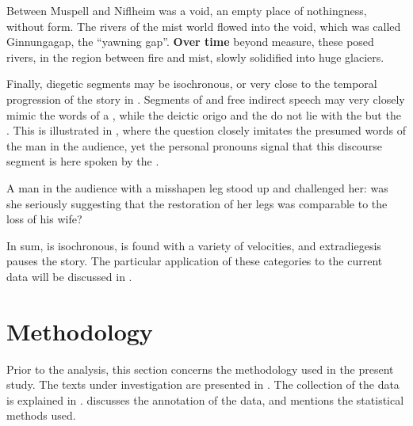 \documentclass[output=paper,colorlinks,citecolor=brown]{langscibook}
\begin{document}
\ea \label{ex:dieg} 
Between Muspell and Niflheim was a void, an empty place of nothingness, without form. The rivers of the mist world flowed into the void, which was called Ginnungagap, the ``yawning gap''. \textbf{Over time} beyond measure, these posed rivers, in the region between fire and mist, slowly solidified into huge glaciers. \hfill \citep[10]{Gaiman2017}
\z

Finally, diegetic segments may be isochronous, or very close to the temporal progression of the story in . Segments of  and free indirect speech may very closely mimic the words of a , while the deictic origo and the  do not lie with the  but the . This is illustrated in , where the question closely imitates the presumed words of the man in the audience, yet the personal pronouns signal that this discourse segment is here spoken by the .

\ea \label{ex:isoNA}
A man in the audience with a misshapen leg stood up and challenged her: was she seriously suggesting that the restoration of her legs was comparable to the loss of his wife? \hfill \citep[130]{Chiang2002}
\z

In sum,  is isochronous,  is found with a variety of velocities, and extradiegesis pauses the story. The particular application of these categories to the current data will be discussed in .


\section{Methodology}\label{sec:3}

Prior to the analysis, this section concerns the methodology used in the present study. The texts under investigation are presented in . The collection of the data is explained in .  discusses the annotation of the data, and  mentions the statistical methods used.
\end{document}
